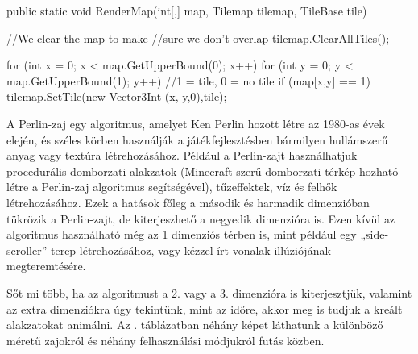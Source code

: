 \begin{java}
public static void RenderMap(int[,] map, 
    Tilemap tilemap, TileBase tile)
{
    //We clear the map to make
    //sure we don't overlap
    tilemap.ClearAllTiles();

    for (int x = 0; x < 
        map.GetUpperBound(0); x++)
    {
        for (int y = 0; y < 
            map.GetUpperBound(1); y++)
        {
            //1 = tile, 0 = no tile
            if (map[x,y] == 1)
            {
                tilemap.SetTile(new Vector3Int
                    (x, y,0),tile);
            }
        }
    }
}
\end{java}


A Perlin-zaj egy algoritmus, amelyet Ken Perlin hozott létre az 1980-as évek elején, és széles körben használják a játékfejlesztésben bármilyen hullámszerű anyag vagy textúra létrehozásához. Például a Perlin-zajt használhatjuk procedurális domborzati alakzatok (Minecraft szerű domborzati térkép hozható létre a Perlin-zaj algoritmus segítségével), tűzeffektek, víz és felhők létrehozásához. Ezek a hatások főleg a második és harmadik dimenzióban tükrözik a Perlin-zajt, de kiterjeszhető a negyedik dimenzióra is. Ezen kívül az algoritmus használható még az 1 dimenziós térben is, mint például egy „side-scroller” terep létrehozásához, vagy kézzel írt vonalak illúziójának megteremtésére. \cite{perlin2}

Sőt mi több, ha az algoritmust a 2. vagy a 3. dimenzióra is kiterjesztjük, valamint az extra dimenziókra úgy tekintünk, mint az időre, akkor meg is tudjuk a kreált alakzatokat animálni. Az . táblázatban néhány képet láthatunk a különböző méretű zajokról és néhány felhasználási módjukról futás közben. \cite{perlin1}

